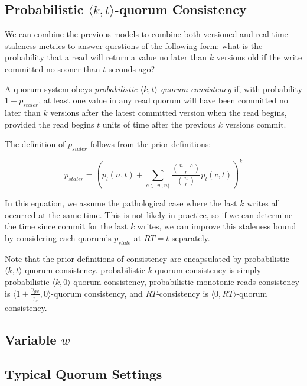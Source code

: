 \documentclass{vldb}
\begin{document}
\subsection{Probabilistic $\langle k, t
  \rangle$-quorum Consistency}

We can combine the previous models to combine both versioned and
real-time staleness metrics to answer questions of the following form:
what is the probability that a read will return a value no later than
$k$ versions old if the write committed no sooner than $t$ seconds
ago?

\begin{definition}
A quorum system obeys \textit{probabilistic $\langle k, t
  \rangle$-quorum consistency} if, with probability $1-p_{staler}$, at
least one value in any read quorum will have been committed no later
than $k$ versions after the latest committed version when the read
begins, provided the read begins $t$ units of time after the previous
$k$ versions commit.
\end{definition}

The definition of $p_{staler}$ follows from the prior definitions:

\begin{equation}
p_{staler} = \left(p_l(n, t)+\sum_{c\in[w, n)} \frac{{n-c \choose r}}{{n \choose r}} p_l(c, t)\right)^k
\end{equation}

In this equation, we assume the pathological case where the last $k$
writes all occurred at the same time.  This is not likely in practice,
so if we can determine the time since commit for the last $k$ writes,
we can improve this staleness bound by considering each quorum's $p_{stale}$ at $RT=t$ separately.

Note that the prior definitions of consistency are encapsulated by
probabilistic $\langle k, t \rangle$-quorum consistency. probabilistic
$k$-quorum consistency is simply probabilistic $\langle k, 0
\rangle$-quorum consistency, probabilistic monotonic reads consistency
is $\langle 1+\frac{\gamma_{gw}}{\gamma_{cr}}, 0 \rangle$-quorum
consistency, and $RT$-consistency is $\langle 0, RT \rangle$-quorum
consistency.

\subsection{Variable $w$}

\subsection{Typical Quorum Settings}
\end{document}
